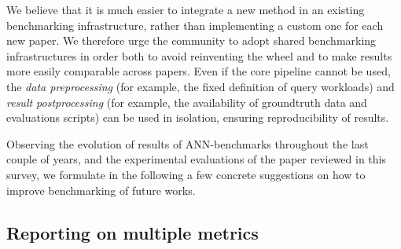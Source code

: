 \documentclass[11pt]{article}
\begin{document}
We believe that it is much easier to integrate a new method in
an existing benchmarking infrastructure, rather than implementing a custom one
for each new paper. We therefore urge the community to adopt shared benchmarking
infrastructures in order both to avoid reinventing the wheel and to make results
more easily comparable across papers.
Even if the core pipeline cannot be used, the \emph{data preprocessing} (for example, the fixed definition of query workloads) and \emph{result postprocessing} (for example, the availability of groundtruth data and evaluations scripts) can be used in isolation, ensuring reproducibility of results.

Observing the evolution of results of ANN-benchmarks throughout the last couple
of years, and the experimental evaluations of the paper reviewed in this
survey, we formulate in the following a few concrete suggestions on how to
improve benchmarking of future works.

\subsection{Reporting on multiple metrics}
\end{document}
